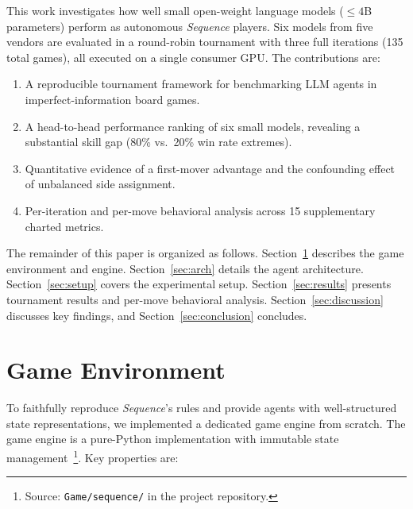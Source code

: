 \documentclass[11pt]{article}
\begin{document}
This work investigates how well small open-weight language models ($\leq 4$B parameters) perform as autonomous \textit{Sequence} players. Six models from five vendors are evaluated in a round-robin tournament with three full iterations (135 total games), all executed on a single consumer GPU. The contributions are:

\begin{enumerate}[nosep]
\item A reproducible tournament framework for benchmarking LLM agents in imperfect-information board games.
\item A head-to-head performance ranking of six small models, revealing a substantial skill gap (80\% vs.\ 20\% win rate extremes).
\item Quantitative evidence of a first-mover advantage and the confounding effect of unbalanced side assignment.
\item Per-iteration and per-move behavioral analysis across 15 supplementary charted metrics.
\end{enumerate}

The remainder of this paper is organized as follows. Section~\ref{sec:env} describes the game environment and engine. Section~\ref{sec:arch} details the agent architecture. Section~\ref{sec:setup} covers the experimental setup. Section~\ref{sec:results} presents tournament results and per-move behavioral analysis. Section~\ref{sec:discussion} discusses key findings, and Section~\ref{sec:conclusion} concludes.

\section{Game Environment}
\label{sec:env}

To faithfully reproduce \textit{Sequence}'s rules and provide agents with well-structured state representations, we implemented a dedicated game engine from scratch. The game engine is a pure-Python implementation with immutable state management~\footnote{Source: \texttt{Game/sequence/} in the project repository.}. Key properties are:
\end{document}

